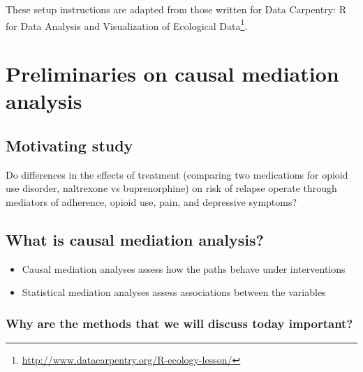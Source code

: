 \documentclass[
  12pt,
]{book}
\providecommand{\tightlist}{%
  \setlength{\itemsep}{0pt}\setlength{\parskip}{0pt}}
\renewcommand{\href}[2]{#2\footnote{\url{#1}}}
\theoremstyle{definition}
\theoremstyle{definition}
\theoremstyle{definition}
\newcommand{\1}{\mathbbm{1}}
\begin{document}
These setup instructions are adapted from those written for \href{http://www.datacarpentry.org/R-ecology-lesson/}{Data Carpentry: R
for Data Analysis and Visualization of Ecological
Data}.

\hypertarget{mediation}{%
\chapter{Preliminaries on causal mediation analysis}\label{mediation}}

\hypertarget{motivating-study}{%
\section{Motivating study}\label{motivating-study}}

Do differences in the effects of treatment (comparing two medications for opioid use disorder, naltrexone vs buprenorphine) on risk of relapse operate through mediators of adherence, opioid use, pain, and depressive symptoms? \citep{rudolph2020explaining}

\hypertarget{what-is-causal-mediation-analysis}{%
\section{What is causal mediation analysis?}\label{what-is-causal-mediation-analysis}}

\begin{itemize}
\tightlist
\item
  Causal mediation analyses assess how the paths behave under interventions
\item
  Statistical mediation analyses assess associations between the variables
\end{itemize}

\hypertarget{why-are-the-methods-that-we-will-discuss-today-important}{%
\subsection{Why are the methods that we will discuss today important?}\label{why-are-the-methods-that-we-will-discuss-today-important}}
\end{document}
